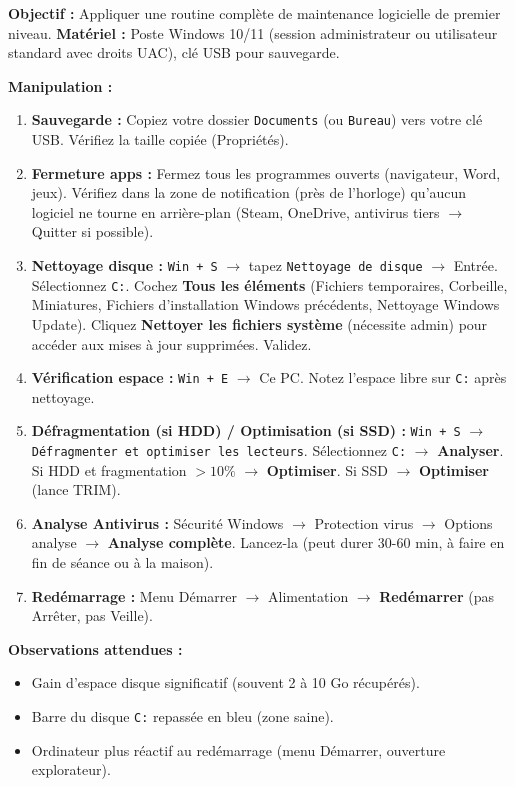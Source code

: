 \documentclass[11pt]{article}
\begin{document}
\begin{experience}
\textbf{Objectif :} Appliquer une routine complète de maintenance logicielle de premier niveau.
\textbf{Matériel :} Poste Windows 10/11 (session administrateur ou utilisateur standard avec droits UAC), clé USB pour sauvegarde.

\textbf{Manipulation :}
\begin{enumerate}
    \item \textbf{Sauvegarde :} Copiez votre dossier \texttt{Documents} (ou \texttt{Bureau}) vers votre clé USB. Vérifiez la taille copiée (Propriétés).
    \item \textbf{Fermeture apps :} Fermez tous les programmes ouverts (navigateur, Word, jeux). Vérifiez dans la zone de notification (près de l'horloge) qu'aucun logiciel ne tourne en arrière-plan (Steam, OneDrive, antivirus tiers $\rightarrow$ Quitter si possible).
    \item \textbf{Nettoyage disque :} \texttt{Win + S} $\rightarrow$ tapez \texttt{Nettoyage de disque} $\rightarrow$ Entrée. Sélectionnez \texttt{C:}. Cochez \textbf{Tous les éléments} (Fichiers temporaires, Corbeille, Miniatures, Fichiers d'installation Windows précédents, Nettoyage Windows Update). Cliquez \textbf{Nettoyer les fichiers système} (nécessite admin) pour accéder aux mises à jour supprimées. Validez.
    \item \textbf{Vérification espace :} \texttt{Win + E} $\rightarrow$ Ce PC. Notez l'espace libre sur \texttt{C:} après nettoyage.
    \item \textbf{Défragmentation (si HDD) / Optimisation (si SSD) :} \texttt{Win + S} $\rightarrow$ \texttt{Défragmenter et optimiser les lecteurs}. Sélectionnez \texttt{C:} $\rightarrow$ \textbf{Analyser}. Si HDD et fragmentation $> 10\%$ $\rightarrow$ \textbf{Optimiser}. Si SSD $\rightarrow$ \textbf{Optimiser} (lance TRIM).
    \item \textbf{Analyse Antivirus :} Sécurité Windows $\rightarrow$ Protection virus $\rightarrow$ Options analyse $\rightarrow$ \textbf{Analyse complète}. Lancez-la (peut durer 30-60 min, à faire en fin de séance ou à la maison).
    \item \textbf{Redémarrage :} Menu Démarrer $\rightarrow$ Alimentation $\rightarrow$ \textbf{Redémarrer} (pas Arrêter, pas Veille).
\end{enumerate}

\textbf{Observations attendues :}
\begin{itemize}
    \item Gain d'espace disque significatif (souvent 2 à 10 Go récupérés).
    \item Barre du disque \texttt{C:} repassée en bleu (zone saine).
    \item Ordinateur plus réactif au redémarrage (menu Démarrer, ouverture explorateur).
\end{itemize}


\end{experience}
\end{document}
